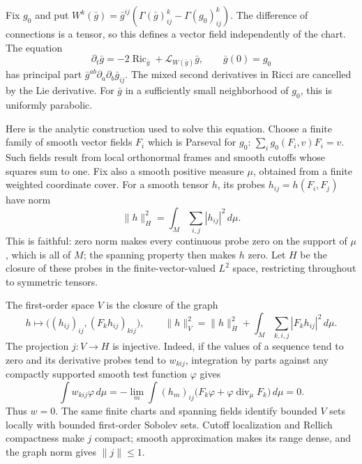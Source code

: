 Fix $g_0$ and put
$W^k(\bar g)=\bar g^{ij}(\Gamma(\bar g)^k_{ij}-\Gamma(g_0)^k_{ij})$.
The difference of connections is a tensor, so this defines a vector field
independently of the chart.  The equation
\begin{equation}\label{eq:rf-deturck}
 \partial_t\bar g=-2\operatorname{Ric}_{\bar g}
                       +\mathcal L_{W(\bar g)}\bar g,\qquad \bar g(0)=g_0
\end{equation}
has principal part $\bar g^{ab}\partial_a\partial_b\bar g_{ij}$.
The mixed second derivatives in Ricci are cancelled by the Lie derivative.
For $\bar g$ in a sufficiently small neighborhood of $g_0$, this is
uniformly parabolic.

Here is the analytic construction used to solve this equation.  Choose
a finite family of smooth vector fields $F_i$ which is Parseval for $g_0$:
$\sum_i g_0(F_i,v)F_i=v$.  Such fields result from local orthonormal
frames and smooth cutoffs whose squares sum to one.  Fix also a smooth
positive measure $\mu$, obtained from a finite weighted coordinate cover.
For a smooth tensor $h$, its probes $h_{ij}=h(F_i,F_j)$ have norm
\[
 \|h\|_H^2=\int_M\sum_{i,j}|h_{ij}|^2\,d\mu.
\]
This is faithful: zero norm makes every continuous probe zero on the
support of $\mu$, which is all of $M$; the spanning property then makes
$h$ zero.  Let $H$ be the closure of these probes in the finite-vector-valued
$L^2$ space, restricting throughout to symmetric tensors.

The first-order space $V$ is the closure of the graph
\[
 h\longmapsto \bigl((h_{ij})_{ij},(F_kh_{ij})_{kij}\bigr),\qquad
 \|h\|_V^2=\|h\|_H^2+
                   \int_M\sum_{k,i,j}|F_kh_{ij}|^2\,d\mu.
\]
The projection $j:V\to H$ is injective.  Indeed, if the values of a
sequence tend to zero and its derivative probes tend to $w_{kij}$,
integration by parts against any compactly supported smooth test function
$\varphi$ gives
\[
 \int w_{kij}\varphi\,d\mu
 =-\lim_m\int (h_m)_{ij}
       \bigl(F_k\varphi+\varphi\operatorname{div}_{\mu}F_k\bigr)\,d\mu=0.
\]
Thus $w=0$.  The same finite charts and spanning fields identify bounded
$V$ sets locally with bounded first-order Sobolev sets.  Cutoff localization
and Rellich compactness make $j$ compact; smooth approximation makes its
range dense, and the graph norm gives $\|j\|\leq1$.

